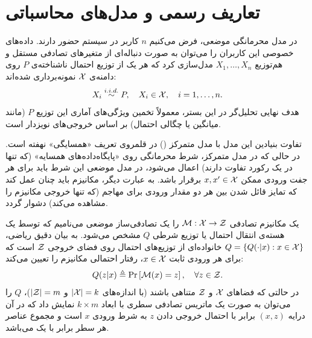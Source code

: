 \section{تعاریف رسمی و مدل‌های محاسباتی}
\label{sec:ldp:definitions}

در مدل محرمانگی موضعی، فرض می‌کنیم $n$ کاربر در سیستم حضور دارند. داده‌های خصوصی این کاربران را می‌توان به صورت دنباله‌ای از متغیرهای تصادفی مستقل و هم‌توزیع $X_1, \dots, X_n$ مدل‌سازی کرد که هر یک از توزیع احتمال ناشناخته‌ی $P$ روی دامنه‌ی $\Xset$ نمونه‌برداری شده‌اند:
\begin{equation}
X_i \overset{i.i.d.}{\sim} P, \quad X_i \in \Xset, \quad i=1, \dots, n.
\end{equation}
هدف نهایی تحلیل‌گر در این بستر، معمولاً تخمین ویژگی‌های آماری این توزیع $P$ (مانند میانگین یا چگالی احتمال) بر اساس خروجی‌های نویزدار است.

تفاوت بنیادین این مدل با مدل متمرکز () در قلمروی تعریف «همسایگی» نهفته است. در حالی که در مدل متمرکز، شرط محرمانگی روی «پایگاه‌داده‌های همسایه» (که تنها در یک رکورد تفاوت دارند) اعمال می‌شود، در مدل موضعی این شرط باید برای هر جفت ورودی ممکن $x, x' \in \Xset$ برقرار باشد. به عبارت دیگر، مکانیزم باید چنان عمل کند که تمایز قائل شدن بین هر دو مقدار ورودی برای مهاجم (که تنها خروجی مکانیزم را مشاهده می‌کند) دشوار گردد.

\begin{تعریف}
\label{def:local-randomizer}
یک مکانیزم تصادفی $\mech: \Xset \to \Zset$ را یک تصادفی‌ساز موضعی می‌نامیم که توسط یک هسته‌ی انتقال احتمال یا توزیع شرطی $Q$ مشخص می‌شود. به بیان دقیق ریاضی، $Q = \{Q(\cdot|x) : x \in \Xset\}$ خانواده‌ای از توزیع‌های احتمال روی فضای خروجی $\Zset$ است که برای هر ورودی ثابت $x \in \Xset$، رفتار احتمالی مکانیزم را تعیین می‌کند:
\begin{equation}
Q(z|x) \triangleq \Pr\left[ \mech(x) = z \right], \quad \forall z \in \Zset.
\end{equation}
در حالتی که فضاهای $\Xset$ و $\Zset$ متناهی باشند (با اندازه‌های $|\Xset| = k$ و $|\Zset| = m$)، $Q$ را می‌توان به صورت یک ماتریس تصادفی سطری با ابعاد $k \times m$ نمایش داد که در آن درایه $(x, z)$ برابر با احتمال خروجی دادن $z$ به شرط ورودی $x$ است و مجموع عناصر هر سطر برابر با یک می‌باشد.
\end{تعریف}



